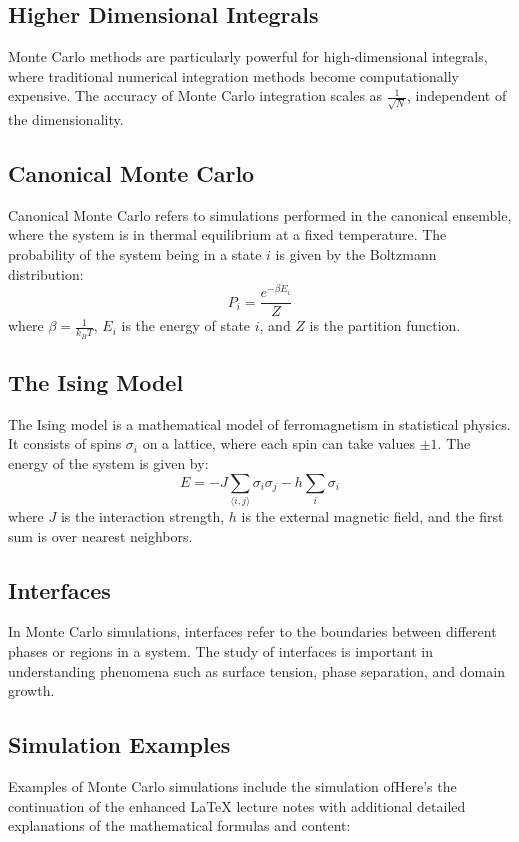\documentclass[12pt]{article}
\begin{document}
\subsection{Higher Dimensional Integrals}
Monte Carlo methods are particularly powerful for high-dimensional integrals, where traditional numerical integration methods become computationally expensive. The accuracy of Monte Carlo integration scales as \( \frac{1}{\sqrt{N}} \), independent of the dimensionality.

\subsection{Canonical Monte Carlo}
Canonical Monte Carlo refers to simulations performed in the canonical ensemble, where the system is in thermal equilibrium at a fixed temperature. The probability of the system being in a state \( i \) is given by the Boltzmann distribution:
\[
P_i = \frac{e^{-\beta E_i}}{Z}
\]
where \( \beta = \frac{1}{k_B T} \), \( E_i \) is the energy of state \( i \), and \( Z \) is the partition function.

\subsection{The Ising Model}
The Ising model is a mathematical model of ferromagnetism in statistical physics. It consists of spins \( \sigma_i \) on a lattice, where each spin can take values \( \pm 1 \). The energy of the system is given by:
\[
E = -J \sum_{\langle i,j \rangle} \sigma_i \sigma_j - h \sum_i \sigma_i
\]
where \( J \) is the interaction strength, \( h \) is the external magnetic field, and the first sum is over nearest neighbors.

\subsection{Interfaces}
In Monte Carlo simulations, interfaces refer to the boundaries between different phases or regions in a system. The study of interfaces is important in understanding phenomena such as surface tension, phase separation, and domain growth.

\subsection{Simulation Examples}
Examples of Monte Carlo simulations include the simulation ofHere's the continuation of the enhanced LaTeX lecture notes with additional detailed explanations of the mathematical formulas and content:
\end{document}
